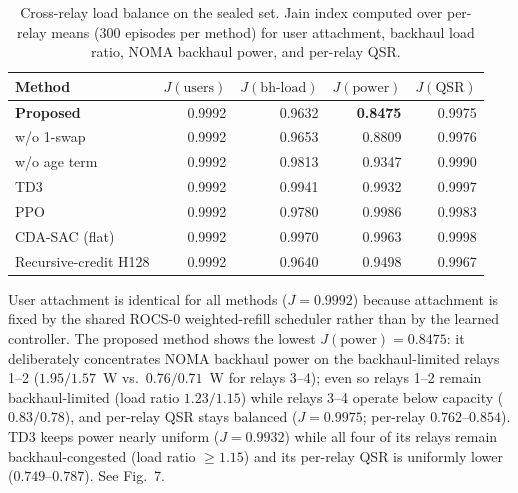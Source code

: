 \begin{table}[t]
\centering
\caption{Cross-relay load balance on the sealed set. Jain index computed over per-relay means (300 episodes per method) for user attachment, backhaul load ratio, NOMA backhaul power, and per-relay QSR.}
\label{tab:relayjain}
\begin{tabular}{@{}lrrrr@{}}
\toprule
Method & $J(\mathrm{users})$ & $J(\mathrm{bh\text{-}load})$ & $J(\mathrm{power})$ & $J(\mathrm{QSR})$ \\
\midrule
\textbf{Proposed} & 0.9992 & 0.9632 & \textbf{0.8475} & 0.9975 \\
w/o 1-swap & 0.9992 & 0.9653 & 0.8809 & 0.9976 \\
w/o age term & 0.9992 & 0.9813 & 0.9347 & 0.9990 \\
TD3 & 0.9992 & 0.9941 & 0.9932 & 0.9997 \\
PPO & 0.9992 & 0.9780 & 0.9986 & 0.9983 \\
CDA-SAC (flat) & 0.9992 & 0.9970 & 0.9963 & 0.9998 \\
Recursive-credit H128 & 0.9992 & 0.9640 & 0.9498 & 0.9967 \\
\bottomrule
\end{tabular}
\begin{flushleft}\footnotesize
User attachment is identical for all methods ($J=0.9992$) because attachment is fixed by the shared ROCS-0 weighted-refill scheduler rather than by the learned controller. The proposed method shows the lowest $J(\mathrm{power})=0.8475$: it deliberately concentrates NOMA backhaul power on the backhaul-limited relays 1--2 ($1.95/1.57$~W vs.\ $0.76/0.71$~W for relays 3--4); even so relays 1--2 remain backhaul-limited (load ratio $1.23/1.15$) while relays 3--4 operate below capacity ($0.83/0.78$), and per-relay QSR stays balanced ($J=0.9975$; per-relay $0.762$--$0.854$). TD3 keeps power nearly uniform ($J=0.9932$) while all four of its relays remain backhaul-congested (load ratio $\geq 1.15$) and its per-relay QSR is uniformly lower ($0.749$--$0.787$). See Fig.~7.
\end{flushleft}
\end{table}
